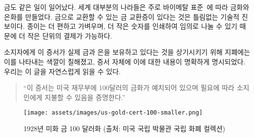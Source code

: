 \begin{comment}
As mentioned above, the same thing happened to gold. Most of the world was on a
bimetallic standard~\cite{wiki:bimetallism}, meaning coins were made
primarily of gold and silver. Having certificates for gold, redeemable in gold
coins, was arguably a technological improvement. Paper is more convenient,
lighter, and since it can be divided arbitrarily by simply printing a smaller
number on it, it is easier to break into smaller units.
\end{comment}
금도 같은 일이 일어났다. 
세계 대부분의 나라들은 주로 바이메탈 표준~\cite{wiki:bimetallism}에 따라 금화와 은화를 만들었다. 
금으로 교환할 수 있는 금 교환증이 있다는 것은 틀림없는 기술적 진보이다.
종이는 더 편하고 가벼우며, 더 작은 숫자를 인쇄하여 임의로 나눌 수 있기 때문에 더 작은 단위의 결제가
가능하다.

\begin{comment}
To remind the bearers (users) that these certificates were
representative for actual gold and silver, they were colored accordingly
and stated this clearly on the certificate itself. You can fluently read
the writing from top to bottom:
\end{comment}
소지자에게 이 증서가 실제 금과 은을 보유하고 있다는 것을 상기시키기 위해 지폐에는 이를 나타내는 색깔이
칠해졌고, 증서 자체에 이에 대한 내용이 명확하게 명시되었다. 
우리는 이 글을 자연스럽게 읽을 수 있다.

\begin{comment}
\begin{quotation}\begin{samepage}
\enquote{This certifies that there have been deposited in the treasury of the
United States of America one hundred dollars in gold coin payable to
the bearer on demand.}
\end{samepage}\end{quotation}
\end{comment}
\begin{quotation}\begin{samepage}
\enquote{이 증서는 미국 재무부에 100달러의 금화가 예치되어 있으며 필요에 따라 소지인에게 
지불할 수 있음을 증명한다.}
\end{samepage}\end{quotation}

\begin{comment}
\begin{figure}
  \centering
  \texttt{[image: assets/images/us-gold-cert-100-smaller.png]}
  \caption{A 1928 U.S. \$100 gold certificate. Picture cc-by-sa National Numismatic Collection, National Museum of American History.}
  \label{fig:us-gold-cert-100-smaller}
\end{figure}
\end{comment}
\begin{figure}
  \centering
  \texttt{[image: assets/images/us-gold-cert-100-smaller.png]}
  \caption{1928년 미화 금 100 달러화 (출처: 미국 국립 박물관 국립 화폐 컬렉션)}
  \label{fig:us-gold-cert-100-smaller}
\end{figure}

